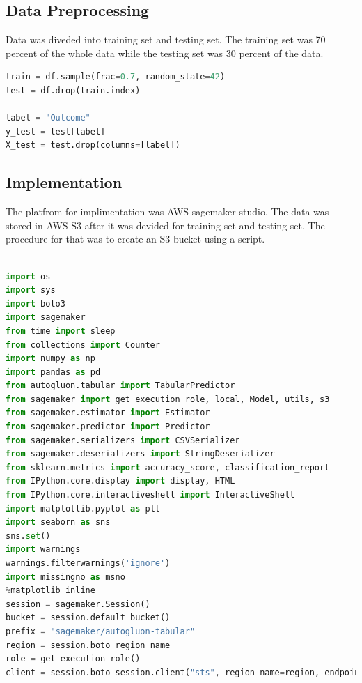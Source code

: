 \documentclass[
]{article}
\begin{document}
\hypertarget{data-preprocessing}{%
\subsection{Data Preprocessing}\label{data-preprocessing}}

Data was diveded into training set and testing set. The training set was
70 percent of the whole data while the testing set was 30 percent of the
data.

\begin{lstlisting}[language=python]
train = df.sample(frac=0.7, random_state=42)
test = df.drop(train.index)

label = "Outcome"
y_test = test[label]
X_test = test.drop(columns=[label])

\end{lstlisting}

\hypertarget{implementation}{%
\subsection{Implementation}\label{implementation}}

The platfrom for implimentation was AWS sagemaker studio. The data was
stored in AWS S3 after it was devided for training set and testing set.
The procedure for that was to create an S3 bucket using a script.

\begin{lstlisting}[language=python]

import os
import sys
import boto3
import sagemaker
from time import sleep
from collections import Counter
import numpy as np
import pandas as pd
from autogluon.tabular import TabularPredictor  
from sagemaker import get_execution_role, local, Model, utils, s3
from sagemaker.estimator import Estimator
from sagemaker.predictor import Predictor
from sagemaker.serializers import CSVSerializer
from sagemaker.deserializers import StringDeserializer
from sklearn.metrics import accuracy_score, classification_report
from IPython.core.display import display, HTML
from IPython.core.interactiveshell import InteractiveShell
import matplotlib.pyplot as plt
import seaborn as sns
sns.set()
import warnings
warnings.filterwarnings('ignore')
import missingno as msno
%matplotlib inline
session = sagemaker.Session()
bucket = session.default_bucket()
prefix = "sagemaker/autogluon-tabular"
region = session.boto_region_name
role = get_execution_role()
client = session.boto_session.client("sts", region_name=region, endpoint_url=utils.sts_regional_endpoint(region))



\end{lstlisting}
\end{document}
